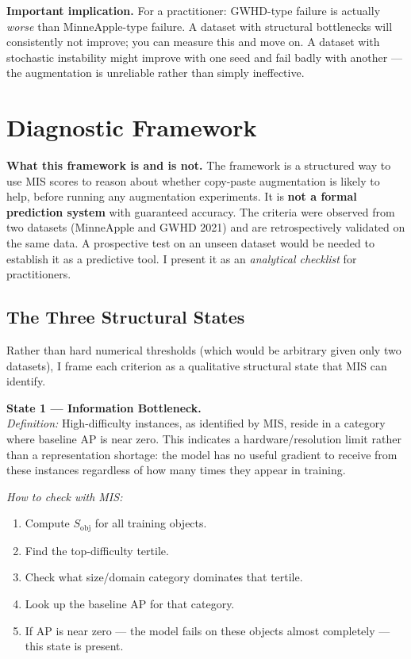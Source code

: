 \documentclass[10pt, a4paper]{article}
\begin{document}
\textbf{Important implication.}
For a practitioner: GWHD-type failure is actually \emph{worse} than
MinneApple-type failure.
A dataset with structural bottlenecks will consistently not improve;
you can measure this and move on.
A dataset with stochastic instability might improve with one seed and
fail badly with another --- the augmentation is unreliable rather than
simply ineffective.

\section{Diagnostic Framework}

\textbf{What this framework is and is not.}
The framework is a structured way to use MIS scores to reason about
whether copy-paste augmentation is likely to help, before running
any augmentation experiments.
It is \textbf{not a formal prediction system} with guaranteed accuracy.
The criteria were observed from two datasets (MinneApple and GWHD 2021)
and are retrospectively validated on the same data.
A prospective test on an unseen dataset would be needed to establish
it as a predictive tool.
I present it as an \emph{analytical checklist} for practitioners.

\subsection{The Three Structural States}

Rather than hard numerical thresholds (which would be arbitrary given
only two datasets), I frame each criterion as a qualitative structural
state that MIS can identify.

\medskip
\noindent\textbf{State 1 --- Information Bottleneck.}\\
\textit{Definition:} High-difficulty instances, as identified by MIS,
reside in a category where baseline AP is near zero.
This indicates a hardware/resolution limit rather than a representation
shortage: the model has no useful gradient to receive from these
instances regardless of how many times they appear in training.

\textit{How to check with MIS:}
\begin{enumerate}[nosep, leftmargin=*]
\item Compute $S_{\text{obj}}$ for all training objects.
\item Find the top-difficulty tertile.
\item Check what size/domain category dominates that tertile.
\item Look up the baseline AP for that category.
\item If AP is near zero --- the model fails on these objects
  almost completely --- this state is present.
\end{enumerate}
\end{document}
